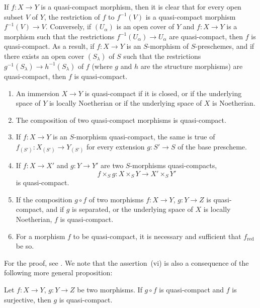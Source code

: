 If $f:X\to Y$ is a quasi-compact morphism, then it is clear that for every open subset $V$ of $Y$, the restriction of $f$ to $f^{-1}(V)$ is a quasi-compact morphism $f^{-1}(V)\to V$.
Conversely, if $(U_\alpha)$ is an open cover of $Y$ and $f:X\to Y$ is a morphism such that the restrictions $f^{-1}(U_\alpha)\to U_\alpha$ are quasi-compact, then $f$ is quasi-compact.
As
a result, if $f:X\to Y$ is an $S$-morphism of $S$-preschemes, and if there exists an open cover $(S_\lambda)$ of $S$ such that the restrictions $g^{-1}(S_\lambda)\to h^{-1}(S_\lambda)$ of $f$ (where $g$ and $h$ are the structure morphisms) are quasi-compact, then $f$ is quasi-compact.

\begin{proposition}[1.1.2]
\label{IV.1.1.2}
\medskip\noindent
\begin{enumerate}[label=(\roman*)]
  \item An immersion $X\to Y$ is quasi-compact if it is closed,
    or if the underlying space of $Y$ is locally Noetherian or if the underlying space of $X$ is Noetherian.
  \item The composition of two quasi-compact morphisms is quasi-compact.
  \item If $f:X\to Y$ is an $S$-morphism quasi-compact, the same is true of $f_{(S')}:X_{(S')}\to Y_{(S')}$
    for every extension $g:S'\to S$ of the base prescheme.
  \item If $f:X\to X'$ and $g:Y\to Y'$ are two $S$-morphisms quasi-compacts,
    \[
      f\times_S g: X\times_S Y \to X'\times_S Y'
    \]
    is quasi-compact.
  \item If the composition $g\circ f$ of two morphisms $f:X\to Y$, $g:Y\to Z$ is quasi-compact, and
    if $g$ is separated, or the underlying space of $X$ is locally Noetherian, $f$ is quasi-compact.
  \item For a morphism $f$ to be quasi-compact, it is necessary and sufficient that $f_{\mathrm{red}}$ be so.
\end{enumerate}
\end{proposition}

For the proof, see .
We note that the assertion~(vi) is also a
consequence of the following more general proposition:

\begin{proposition}[1.1.3]
\label{IV.1.1.3}
Let $f:X\to Y$, $g:Y\to Z$ be two morphisms. If $g\circ f$ is quasi-compact and $f$ is surjective, then $g$ is quasi-compact.
\end{proposition}

